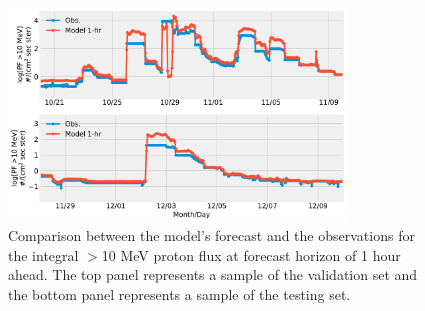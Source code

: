 \begin{table}[!htp]
	\centering
	\caption{The MSE/MAE for the validation and test sets over six forecasting windows.}
	\label{tab:my-table}
\end{table}

\begin{figure}[!htp]
	\centering
	\includegraphics[width=0.8\textwidth]{chapter4/figs/hourly_PF10/sample_valandtestsets_2003.pdf}
	\caption{Comparison between the model’s forecast and the observations for the integral $>$10 MeV proton flux at forecast horizon of 1 hour ahead. The top panel represents a sample of the validation set and the bottom panel represents a sample of the testing set.}
	\label{fig_sample_pf10_hr}
\end{figure}

